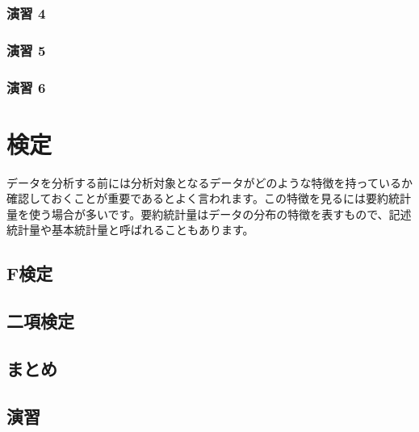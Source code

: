 \documentclass[
  12pt,
]{book}
\begin{document}
\hypertarget{ux6f14ux7fd2-4-1}{%
\subsubsection*{演習 4}\label{ux6f14ux7fd2-4-1}}

\hypertarget{ux6f14ux7fd2-5}{%
\subsubsection*{演習 5}\label{ux6f14ux7fd2-5}}

\hypertarget{ux6f14ux7fd2-6}{%
\subsubsection*{演習 6}\label{ux6f14ux7fd2-6}}

\hypertarget{ux691cux5b9a}{%
\section{検定}\label{ux691cux5b9a}}

データを分析する前には分析対象となるデータがどのような特徴を持っているか確認しておくことが重要であるとよく言われます。この特徴を見るには要約統計量を使う場合が多いです。要約統計量はデータの分布の特徴を表すもので、記述統計量や基本統計量と呼ばれることもあります。

\hypertarget{fux691cux5b9a}{%
\subsection{F検定}\label{fux691cux5b9a}}

\hypertarget{ux4e8cux9805ux691cux5b9a}{%
\subsection{二項検定}\label{ux4e8cux9805ux691cux5b9a}}

\hypertarget{ux307eux3068ux3081-2}{%
\subsection{まとめ}\label{ux307eux3068ux3081-2}}

\hypertarget{ux6f14ux7fd2-7}{%
\subsection{演習}\label{ux6f14ux7fd2-7}}
\end{document}
